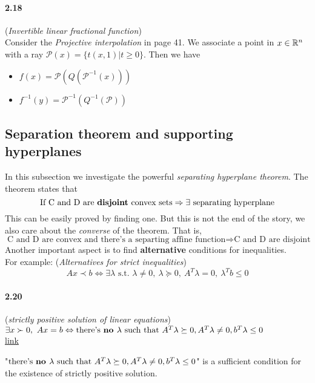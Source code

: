 \documentclass[11pt]{article}
\begin{document}
\paragraph{2.18} ({\it Invertible linear fractional function})\\
\concept Consider the {\it Projective interpolation} in page 41.
\details We associate a point in $x\in{\mathbb R}^n$ with a ray $\mathcal{P}(x) = \{t(x,1)|t\geq0\}$. Then we have
\begin{itemize}
	\item $f(x) = \mathcal{P}(Q(\mathcal{P}^{-1}(x)))$
	\item $f^{-1}(y) = \mathcal{P}^{-1}(Q^{-1}(\mathcal{P}))$
\end{itemize}

\subsection{Separation theorem and supporting hyperplanes}
In this subsection we investigate the powerful {\it separating hyperplane theorem}. The theorem states that
$$\mbox{If C and D are {\bf disjoint} convex sets}\Rightarrow \exists\mbox{ separating hyperplane}$$
This can be easily proved by finding one. But this is not the end of the story, we also care about the {\it converse} of the theorem. That is,
$$\mbox{C and D are convex and there's a separting affine function}\Rightarrow \mbox{C and D are disjoint}$$
Another important aspect is to find {\bf alternative} conditions for inequalities.\\
For example: ({\it Alternatives for strict inequalities})
$$Ax\prec b\Leftrightarrow \exists\lambda\mbox{ s.t. }\lambda\neq0,\ \lambda\succeq0,\ A^T\lambda=0,\ \lambda^Tb\leq0$$


\paragraph{2.20} ({\it strictly positive solution of linear equations})\label{2.20}\\
\goal $\exists x\succ0,\ Ax=b\Leftrightarrow\mbox{there's {\bf no }}\lambda\ \mbox{such that } A^T\lambda\succeq0,A^T\lambda\neq0,b^T\lambda\leq0$\\
\details \hyperref[2.20details]{link}
\begin{intuition}
	"$\mbox{there's {\bf no }}\lambda\ \mbox{such that } A^T\lambda\succeq0,A^T\lambda\neq0,b^T\lambda\leq0$" is a sufficient condition for the existence of strictly positive solution.
\end{intuition}
\end{document}
